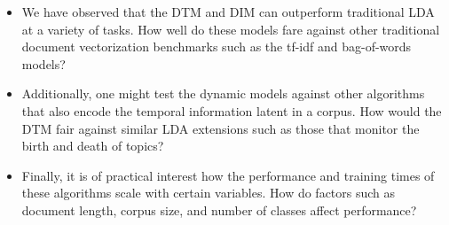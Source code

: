 \begin{itemize}

\item We have observed that the DTM and DIM can outperform traditional LDA at a variety of tasks. How well do these models fare against other traditional document vectorization benchmarks such as the tf-idf and bag-of-words models?

\item Additionally, one might test the dynamic models against other algorithms that also encode the temporal information latent in a corpus. How would the DTM fair against similar LDA extensions such as those that monitor the birth and death of topics?

\item Finally, it is of practical interest how the performance and training times of these algorithms scale with certain variables. How do factors such as document length, corpus size, and number of classes affect performance?

\end{itemize}



